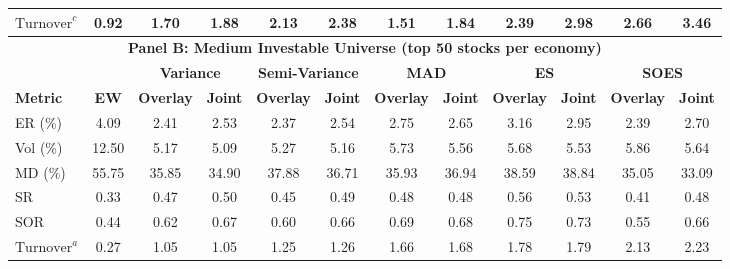 \begin{table}[tbp]
{\begin{tabular}{l*{11}{c}}
    $\text{Turnover}^c$      & 0.92             & 1.70             & 1.88             & 2.13             & 2.38             & 1.51             & 1.84             & 2.39             & 2.98             & 2.66             & 3.46 \\
    \midrule
    \multicolumn{12}{c}{\textbf{Panel B: Medium Investable Universe (top 50 stocks per economy)}} \\
    \midrule
                             &                  & \multicolumn{2}{c}{\textbf{Variance}} & \multicolumn{2}{c}{\textbf{Semi-Variance}} & \multicolumn{2}{c}{\textbf{MAD}} & \multicolumn{2}{c}{\textbf{ES}} & \multicolumn{2}{c}{\textbf{SOES}} \\
    \cmidrule(lr){3-4} \cmidrule(lr){5-6} \cmidrule(lr){7-8} \cmidrule(lr){9-10} \cmidrule(lr){11-12}
    \textbf{Metric}          & \textbf{EW}      & \textbf{Overlay} & \textbf{Joint}   & \textbf{Overlay} & \textbf{Joint}   & \textbf{Overlay} & \textbf{Joint}   & \textbf{Overlay} & \textbf{Joint}   & \textbf{Overlay} & \textbf{Joint} \\
    \midrule
    ER (\%)                  & 4.09             & 2.41             & 2.53             & 2.37             & 2.54             & 2.75             & 2.65             & 3.16             & 2.95             & 2.39             & 2.70 \\
    Vol (\%)                 & 12.50            & 5.17             & 5.09             & 5.27             & 5.16             & 5.73             & 5.56             & 5.68             & 5.53             & 5.86             & 5.64 \\
    MD (\%)                  & 55.75            & 35.85            & 34.90            & 37.88            & 36.71            & 35.93            & 36.94            & 38.59            & 38.84            & 35.05            & 33.09 \\
    SR                       & 0.33             & 0.47             & 0.50             & 0.45             & 0.49             & 0.48             & 0.48             & 0.56             & 0.53             & 0.41             & 0.48 \\
    SOR                      & 0.44             & 0.62             & 0.67             & 0.60             & 0.66             & 0.69             & 0.68             & 0.75             & 0.73             & 0.55             & 0.66 \\
    $\text{Turnover}^a$      & 0.27             & 1.05             & 1.05             & 1.25             & 1.26             & 1.66             & 1.68             & 1.78             & 1.79             & 2.13             & 2.23 \\

\end{tabular}}
\end{table}

